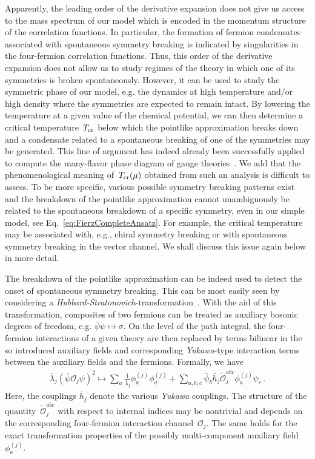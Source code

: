 \documentclass[prd,english,preprintnumbers,amsmath,amssymb,nofootinbib,twocolumn,superscriptaddress]{revtex4-1}
\newcommand{\be}{\begin{eqnarray}}
\newcommand{\ee}{\end{eqnarray}}
\begin{document}
{Apparently, the leading order of the derivative expansion does not give us access to the mass spectrum of our model
which is encoded in the momentum structure of the correlation functions. In particular, the formation of
fermion condensates associated with spontaneous symmetry breaking is indicated by singularities in
the four-fermion correlation functions. 
Thus, this order of the derivative expansion does not allow us to study regimes of the theory in which one of its
symmetries is broken spontaneously. However, it can be used to study the symmetric phase of our model, e.g.
the dynamics at high temperature and/or high density where the symmetries are expected to remain intact.
By lowering the temperature at a given value of the chemical potential, we can then determine a
critical temperature~$T_{\rm cr}$ below which the pointlike approximation
breaks down and a {condensate related to a spontaneous breaking of one} of the symmetries may be generated. 
This line of argument has indeed already
been successfully applied to compute the many-flavor phase diagram of gauge theories~\cite{Gies:2005as,Braun:2005uj,Braun:2006jd,Braun:2014wja}.
We add that the phenomenological meaning of~$T_{\rm cr}(\mu)$ obtained from such an analysis is difficult to assess. 
To be more specific, various possible symmetry breaking patterns exist and the breakdown of the pointlike approximation cannot 
unambiguously be related to the spontaneous breakdown of a specific symmetry, even in our
simple model, see Eq.~\eqref{eq:FierzCompleteAnsatz}. For example, the critical temperature may be associated with, e.g., chiral
symmetry breaking or with spontaneous symmetry breaking in the vector channel. We shall discuss {this issue again below
in more detail.}

The breakdown of the pointlike approximation can be indeed used to detect the onset of spontaneous symmetry breaking.
This can be most easily seen by considering a {\it Hubbard-Stratonovich}-transformation~\cite{Hubbard:1959ub, *Stratonovich}.
With the aid of this transformation, composites of two fermions can be treated as auxiliary bosonic degrees of freedom, e.g. $\bar{\psi}\psi \mapsto \sigma$.
On the level of the path integral, the four-fermion interactions of a given theory are then replaced by terms bilinear in the
so introduced auxiliary fields and corresponding 
{\it Yukawa}-type interaction terms between the auxiliary fields and the fermions. Formally, we have
%
\be
\!\!\!\!\!\!\bar{\lambda}_j (\bar{\psi}{\mathcal O}_j\psi)^2 \mapsto \sum_a\frac{1}{\bar{\lambda}_j}\phi^{(j)}_a\phi^{(j)}_a
+ \sum_{a,b,c}\bar{\psi}_b \bar{h}_{j}\tilde{{\mathcal O}}_{j}^{abc}\phi^{(j)}_a \psi_c\,.
\label{eq:hst}
\ee
% 
Here, the couplings $\bar{h}_j$ denote the various {\it Yukawa} couplings.
The structure of the quantity~$\tilde{{\mathcal O}}_{j}^{abc}$ 
with respect to internal indices may be nontrivial and depends 
on the corresponding four-fermion interaction channel~${\mathcal O}_j$. The same holds for the exact transformation properties of the
possibly multi-component auxiliary field~$\phi^{(j)}_a$. 

}
\end{document}
